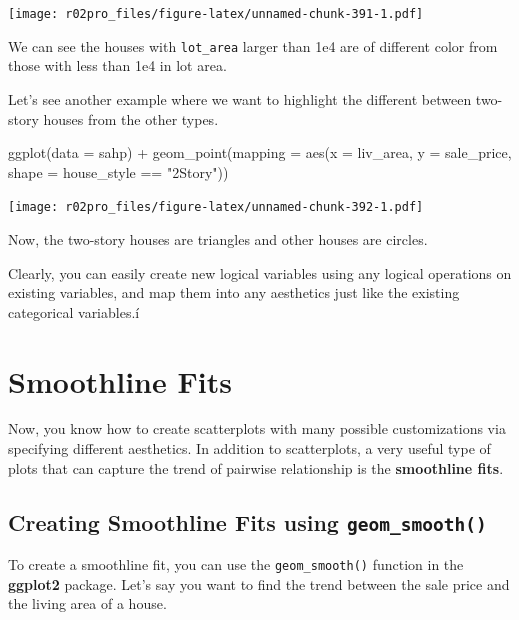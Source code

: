 \documentclass[
]{book}
\newenvironment{Shaded}{\begin{snugshade}}{\end{snugshade}}
\newcommand{\AttributeTok}[1]{\textcolor[rgb]{0.77,0.63,0.00}{#1}}
\newcommand{\FunctionTok}[1]{\textcolor[rgb]{0.00,0.00,0.00}{#1}}
\newcommand{\NormalTok}[1]{#1}
\newcommand{\SpecialCharTok}[1]{\textcolor[rgb]{0.00,0.00,0.00}{#1}}
\newcommand{\StringTok}[1]{\textcolor[rgb]{0.31,0.60,0.02}{#1}}
\begin{document}
\texttt{[image: r02pro\_files/figure-latex/unnamed-chunk-391-1.pdf]}

We can see the houses with \texttt{lot\_area} larger than 1e4 are of different color from those with less than 1e4 in lot area.

Let's see another example where we want to highlight the different between two-story houses from the other types.

\begin{Shaded}
\begin{Highlighting}[]
\FunctionTok{ggplot}\NormalTok{(}\AttributeTok{data =}\NormalTok{ sahp) }\SpecialCharTok{+} \FunctionTok{geom\_point}\NormalTok{(}\AttributeTok{mapping =} \FunctionTok{aes}\NormalTok{(}\AttributeTok{x =}\NormalTok{ liv\_area, }\AttributeTok{y =}\NormalTok{ sale\_price, }\AttributeTok{shape =}\NormalTok{ house\_style }\SpecialCharTok{==} \StringTok{"2Story"}\NormalTok{))}
\end{Highlighting}
\end{Shaded}

\texttt{[image: r02pro\_files/figure-latex/unnamed-chunk-392-1.pdf]}

Now, the two-story houses are triangles and other houses are circles.

Clearly, you can easily create new logical variables using any logical operations on existing variables, and map them into any aesthetics just like the existing categorical variables.í

\hypertarget{smoothline}{%
\section{Smoothline Fits}\label{smoothline}}

Now, you know how to create scatterplots with many possible customizations via specifying different aesthetics. In addition to scatterplots, a very useful type of plots that can capture the trend of pairwise relationship is the \textbf{smoothline fits}.

\hypertarget{creating-smoothline-fits-using-geom_smooth}{%
\subsection{\texorpdfstring{Creating Smoothline Fits using \texttt{geom\_smooth()}}{Creating Smoothline Fits using geom\_smooth()}}\label{creating-smoothline-fits-using-geom_smooth}}

To create a smoothline fit, you can use the \texttt{geom\_smooth()} function in the \textbf{ggplot2} package. Let's say you want to find the trend between the sale price and the living area of a house.
\end{document}
